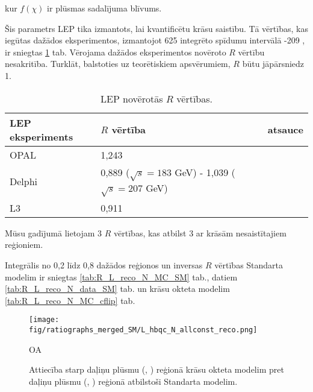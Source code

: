 kur $f(\chi)$ ir plūsmas sadalījuma blīvums.

Šis parametrs LEP tika izmantots, lai kvantificētu krāsu saistību. Tā vērtības, kas iegūtas dažādos eksperimentos, izmantojot 625 \pbinv integrēto spīdumu intervālā -209 \GeV, ir sniegtas \ref{tab:LEP_R} tab. Vērojama dažādos eksperimentos novēroto $R$ vērtību nesakritība. Turklāt, balstoties uz teorētiskiem apsvērumiem, $R$ būtu jāpārsniedz 1.

\begin{table}
\centering
\caption{LEP novērotās $R$ vērtības.}
\label{tab:LEP_R}
\begin{tabular}{lll}
LEP eksperiments & $R$ vērtība                                             & atsauce\\
\hline
    OPAL         & 1,243                                                   & \cite{Abbiendi:2005es}\\
    Delphi       & 0,889 ($\sqrt{s}=183$ GeV) - 1,039 ($\sqrt{s}=207$ GeV) & \cite{Abdallah:2006uq}\\
    L3           & 0,911                                                   & \cite{Achard:2003pe}\\
  \end{tabular}
\end{table} 

Mūsu gadījumā lietojam 3 $R$ vērtības, kas atbilst 3 ar krāsām nesaistītajiem reģioniem.

Integrālis no 0,2 līdz 0,8 dažādos reģionos un inversas $R$ vērtības Standarta modelim ir sniegtas \ref{tab:R_L_reco_N_MC_SM} tab., datiem \ref{tab:R_L_reco_N_data_SM} tab. un krāsu okteta \PW modelim \ref{tab:R_L_reco_N_MC_cflip} tab.



\begin{figure}[htpb]
\def\twidth{0.45}
\centering
\texttt{[image: fig/ratiographs\_merged\_SM/L\_hbqc\_N\_allconst\_reco.png]}
\caption{Attiecība starp daļiņu plūsmu (\leadingjet, \scndleadingjet) reģionā krāsu okteta \PW modelim pret daļiņu plūsmu (\leadingjet, \scndleadingjet) reģionā atbilstoši Standarta modelim.}
\label{fig:ratio_hbqc}OA
\end{figure}








